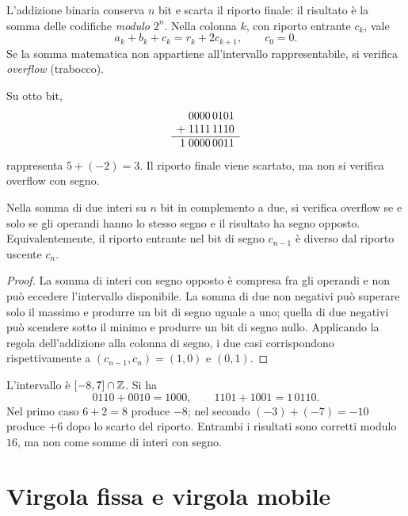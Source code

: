 L'addizione binaria conserva \(n\) bit e scarta il riporto finale:
il risultato è la somma delle codifiche \emph{modulo} \(2^n\).
Nella colonna \(k\), con riporto entrante \(c_k\), vale
\[
  a_k+b_k+c_k=r_k+2c_{k+1},\qquad c_0=0.
\]
Se la somma matematica non appartiene all'intervallo rappresentabile,
si verifica \emph{overflow} (trabocco).

\begin{example}
Su otto bit,
\[
  \begin{array}{r@{\;}r}
      &0000\,0101\\
    + &1111\,1110\\ \hline
    1 &0000\,0011
  \end{array}
\]
rappresenta \(5+(-2)=3\). Il riporto finale viene scartato, ma
non si verifica overflow con segno.
\end{example}

\begin{proposition}
\label{prop:fi-overflow-somma}
Nella somma di due interi su \(n\) bit in complemento a due,
si verifica overflow se e solo se gli operandi hanno lo stesso segno
e il risultato ha segno opposto. Equivalentemente, il riporto
entrante nel bit di segno \(c_{n-1}\) è diverso dal riporto uscente
\(c_n\).
\end{proposition}

\begin{proof}
La somma di interi con segno opposto è compresa fra gli operandi e non
può eccedere l'intervallo disponibile. La somma di due non negativi
può superare solo il massimo e produrre un bit di segno uguale a uno;
quella di due negativi può scendere sotto il minimo e produrre un
bit di segno nullo. Applicando la regola dell'addizione alla colonna di
segno, i due casi corrispondono rispettivamente a
\((c_{n-1},c_n)=(1,0)\) e \((0,1)\).
\end{proof}

\begin{example}
L'intervallo è \([-8,7]\cap\mathbb{Z}\). Si ha
\[
  0110+0010=1000,\qquad 1101+1001=1\,0110.
\]
Nel primo caso \(6+2=8\) produce \(-8\); nel secondo
\((-3)+(-7)=-10\) produce \(+6\) dopo lo scarto del riporto.
Entrambi i risultati sono corretti modulo \(16\), ma non come
somme di interi con segno.
\end{example}

\section{Virgola fissa e virgola mobile}
\label{sec:fi-virgola-mobile}

